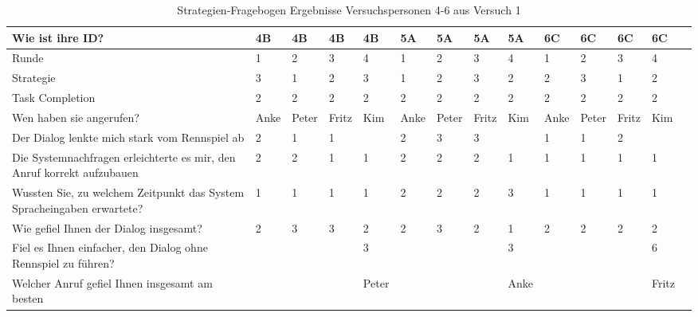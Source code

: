 \documentclass[12pt,a4paper]{scrartcl}
\begin{document}
\begin{appendix}
\begin{table}
\caption{Strategien-Fragebogen Ergebnisse Versuchspersonen 4-6 aus Versuch 1}
\begin{tabular}{|p{6cm}| p{0.8cm} | p{0.8cm} | p{0.8cm} | p{0.8cm} || p{0.8cm} | p{0.8cm} | p{0.8cm} | p{0.8cm} || p{0.8cm} | p{0.8cm} | p{0.8cm} | p{0.8cm} | p{} | }
\hline
	Wie ist ihre ID? & 4B & 4B & 4B & 4B & 5A & 5A & 5A & 5A & 6C & 6C & 6C & 6C \\ \hline \hline
	Runde & 1 & 2 & 3 & 4 & 1 & 2 & 3 & 4 & 1 & 2 & 3 & 4 \\ \hline
	Strategie & 3 & 1 & 2 & 3 & 1 & 2 & 3 & 2 & 2 & 3 & 1 & 2 \\ \hline \hline
	Task Completion & 2 & 2 & 2 & 2 & 2 & 2 & 2 & 2 & 2 & 2 & 2 & 2 \\ \hline \hline
	Wen haben sie angerufen? & Anke & Peter & Fritz & Kim & Anke & Peter & Fritz & Kim & Anke & Peter & Fritz & Kim \\ \hline
	Der Dialog lenkte mich stark vom Rennspiel ab & 2 & 1 & 1 &  & 2 & 3 & 3 &  & 1 & 1 & 2 &  \\ \hline
	Die Systemnachfragen erleichterte es mir, den Anruf korrekt aufzubauen & 2 & 2 & 1 & 1 & 2 & 2 & 2 & 1 & 1 & 1 & 1 & 1 \\ \hline
	Wussten Sie, zu welchem Zeitpunkt das System Spracheingaben erwartete? & 1 & 1 & 1 & 1 & 2 & 2 & 2 & 3 & 1 & 1 & 1 & 1 \\ \hline
	Wie gefiel Ihnen der Dialog insgesamt? & 2 & 3 & 3 & 2 & 2 & 3 & 2 & 1 & 2 & 2 & 2 & 2 \\ \hline
	Fiel es Ihnen einfacher, den Dialog ohne Rennspiel zu führen? &  &  &  & 3 &  &  &  & 3 &  &  &  & 6 \\ \hline
	Welcher Anruf gefiel Ihnen insgesamt am besten &  &  &  & Peter  &  &  &  & Anke &  &  &  & Fritz \\ \hline
\end{tabular}
\end{table}


\end{appendix}
\end{document}
